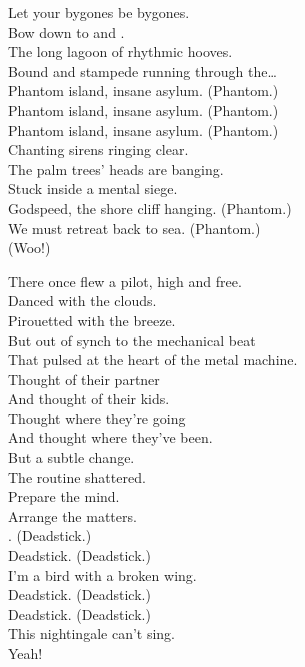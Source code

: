 Let your bygones be bygones. \\
Bow down to  and . \\
The long lagoon of rhythmic hooves. \\
Bound and stampede running through the… \\

Phantom island, insane asylum. (Phantom.) \\
Phantom island, insane asylum. (Phantom.) \\
Phantom island, insane asylum. (Phantom.) \\
Chanting sirens ringing clear. \\

The palm trees' heads are banging. \\
Stuck inside a mental siege. \\
Godspeed, the shore cliff hanging. (Phantom.) \\
We must retreat back to sea. (Phantom.) \\
(Woo!) \\





There once flew a pilot, high and free. \\
Danced with the clouds. \\
Pirouetted with the breeze. \\
But out of synch to the mechanical beat \\
That pulsed at the heart of the metal machine. \\

Thought of their partner \\
And thought of their kids. \\
Thought where they're going \\
And thought where they've been. \\
But a subtle change. \\
The routine shattered. \\
Prepare the mind. \\
Arrange the matters. \\

. (Deadstick.) \\
Deadstick. (Deadstick.) \\
I'm a bird with a broken wing. \\
Deadstick. (Deadstick.) \\
Deadstick. (Deadstick.) \\
This nightingale can't sing. \\
Yeah! \\

